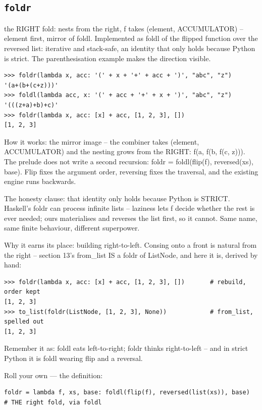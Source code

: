 \documentclass[10pt,letterpaper]{book}
\begin{document}
\subsection{\texttt{foldr}}\label{def:foldr}
the RIGHT fold: nests from the right, f takes (element, ACCUMULATOR) -- element first, mirror of foldl. Implemented as foldl of the flipped function over the reversed list: iterative and stack-safe, an identity that only holds because Python is strict. The parenthesisation example makes the direction visible.
\begin{lstlisting}[style=ex]
>>> foldr(lambda x, acc: '(' + x + '+' + acc + ')', "abc", "z")
'(a+(b+(c+z)))'
>>> foldl(lambda acc, x: '(' + acc + '+' + x + ')', "abc", "z")
'(((z+a)+b)+c)'
>>> foldr(lambda x, acc: [x] + acc, [1, 2, 3], [])
[1, 2, 3]
\end{lstlisting}

How it works: the mirror image -- the combiner takes (element, ACCUMULATOR) and the nesting grows from the RIGHT: f(a, f(b, f(c, z))). The prelude does not write a second recursion: foldr = foldl(flip(f), reversed(xs), base). Flip fixes the argument order, reversing fixes the traversal, and the existing engine runs backwards.


The honesty clause: that identity only holds because Python is STRICT. Haskell's foldr can process infinite lists -- laziness lets f decide whether the rest is ever needed; ours materialises and reverses the list first, so it cannot. Same name, same finite behaviour, different superpower.


Why it earns its place: building right-to-left. Consing onto a front is natural from the right -- section 13's from\_list IS a foldr of ListNode, and here it is, derived by hand:

\begin{lstlisting}[style=ex]
>>> foldr(lambda x, acc: [x] + acc, [1, 2, 3], [])       # rebuild, order kept
[1, 2, 3]
>>> to_list(foldr(ListNode, [1, 2, 3], None))            # from_list, spelled out
[1, 2, 3]
\end{lstlisting}

Remember it as: foldl eats left-to-right; foldr thinks right-to-left -- and in strict Python it is foldl wearing flip and a reversal.


Roll your own --- the definition:

\begin{lstlisting}[style=ex]
foldr = lambda f, xs, base: foldl(flip(f), reversed(list(xs)), base)  # THE right fold, via foldl
\end{lstlisting}
\end{document}
